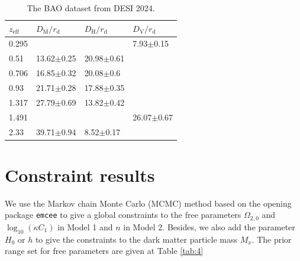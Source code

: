 \documentclass[twocolumn]{aastex631}
\begin{document}
   \begin{table}[htbp]
      \centering
      \begin{tabular}{llll}
         \hline\hline
         $z_{\text{eff}}$ & $D_{\text{M}}/r_{\text{d}}$ & 
         $D_{\text{H}}/r_{\text{d}}$ & $D_{\text{V}}/r_{\text{d}}$ \\
         \hline
         0.295 & & & 7.93$\pm$0.15 \\
         0.51 & 13.62$\pm$0.25 & 20.98$\pm$0.61 & \\
         0.706 & 16.85$\pm$0.32 & 20.08$\pm$0.6 & \\
         0.93 & 21.71$\pm$0.28 & 17.88$\pm$0.35 & \\
         1.317 & 27.79$\pm$0.69 & 13.82$\pm$0.42 & \\
         1.491 & & & 26.07$\pm$0.67 \\
         2.33 & 39.71$\pm$0.94 & 8.52$\pm$0.17 & \\
         \hline
      \end{tabular}
      \caption{The BAO dataset from DESI 2024.}
      \label{tab:3}
   \end{table}

\section{Constraint results}

   We use the Markov chain Monte Carlo (MCMC) method based 
   on the opening package \texttt{emcee} to give a global constraints
   to the free parameters $\Omega_{2,0}$ and $\log_{10}(\kappa C_1)$ in 
   Model 1 and $n$ in Model 2.
   Besides, we also add the parameter $H_0$ or $h$ to give the constraints
   to the dark matter particle mass $M_x$.
   The prior range set for free parameters are given at Table \ref{tab:4}
\end{document}
